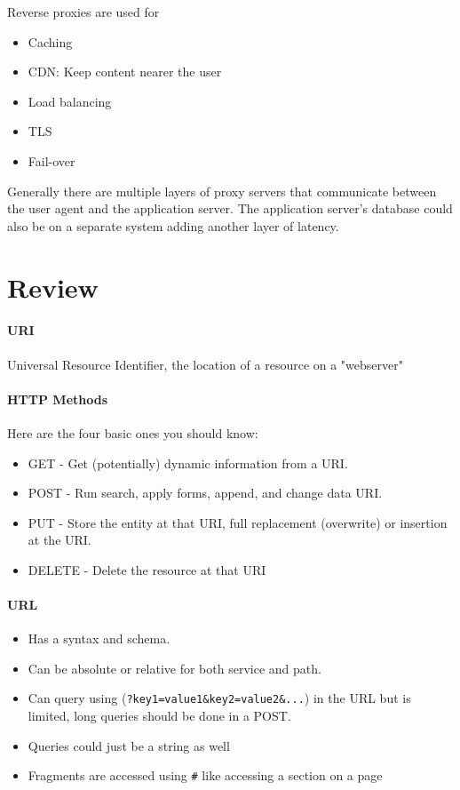 \documentclass[../CMPUT-404-Notes.tex]{subfiles}
\begin{document}
Reverse proxies are used for 
\begin{itemize}
  \item Caching
  \item CDN: Keep content nearer the user
  \item Load balancing
  \item TLS
  \item Fail-over
\end{itemize}

Generally there are multiple layers of proxy servers that communicate between the user agent and the application server.
The application server's database could also be on a separate system adding another layer of latency.


\section{Review}
\paragraph{URI}
Universal Resource Identifier, the location of a resource on a "webserver"
\paragraph{HTTP Methods}
Here are the four basic ones you should know:
\begin{itemize}
  \item GET - Get (potentially) dynamic information from a URI.
  \item POST - Run search, apply forms, append, and change data URI.
  \item PUT - Store the entity at that URI, full replacement (overwrite) or insertion at the URI.
  \item DELETE - Delete the resource at that URI
\end{itemize}
\paragraph{URL}
\begin{itemize}
  \item Has a syntax and schema.
  \item Can be absolute or relative for both service and path.
  \item Can query using (\texttt{?key1=value1\&key2=value2\&...}) in the URL but is limited, long queries should be done in a POST. 
  \item Queries could just be a string as well
  \item Fragments are accessed using \texttt{\#} like accessing a section on a page
\end{itemize}
\end{document}
